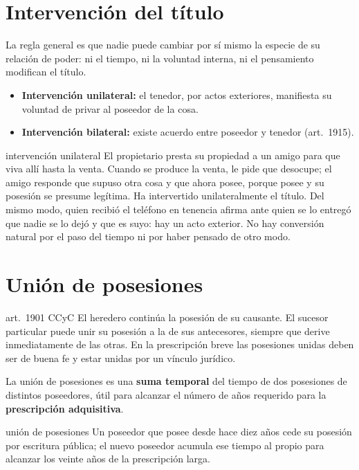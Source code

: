 \documentclass[12pt,oneside]{book}
\begin{document}
\section{Intervención del título}

La regla general es que nadie puede cambiar por sí mismo la especie de su relación de poder: ni el tiempo, ni la voluntad interna, ni el pensamiento modifican el título.

\begin{itemize}
    \item \textbf{Intervención unilateral:} el tenedor, por actos exteriores, manifiesta su voluntad de privar al poseedor de la cosa.
    \item \textbf{Intervención bilateral:} existe acuerdo entre poseedor y tenedor (art.~1915).
\end{itemize}

\begin{ejemplo}{intervención unilateral}
El propietario presta su propiedad a un amigo para que viva allí hasta la venta. Cuando se produce la venta, le pide que desocupe; el amigo responde que supuso otra cosa y que ahora posee, porque posee y su posesión se presume legítima. Ha intervertido unilateralmente el título. Del mismo modo, quien recibió el teléfono en tenencia afirma ante quien se lo entregó que nadie se lo dejó y que es suyo: hay un acto exterior. No hay conversión natural por el paso del tiempo ni por haber pensado de otro modo.
\end{ejemplo}

\section{Unión de posesiones}

\begin{regla}{art.~1901 CCyC}
El heredero continúa la posesión de su causante. El sucesor particular puede unir su posesión a la de sus antecesores, siempre que derive inmediatamente de las otras. En la prescripción breve las posesiones unidas deben ser de buena fe y estar unidas por un vínculo jurídico.
\end{regla}

La unión de posesiones es una \textbf{suma temporal} del tiempo de dos posesiones de distintos poseedores, útil para alcanzar el número de años requerido para la \textbf{prescripción adquisitiva}.

\begin{ejemplo}{unión de posesiones}
Un poseedor que posee desde hace diez años cede su posesión por escritura pública; el nuevo poseedor acumula ese tiempo al propio para alcanzar los veinte años de la prescripción larga.
\end{ejemplo}
\end{document}
